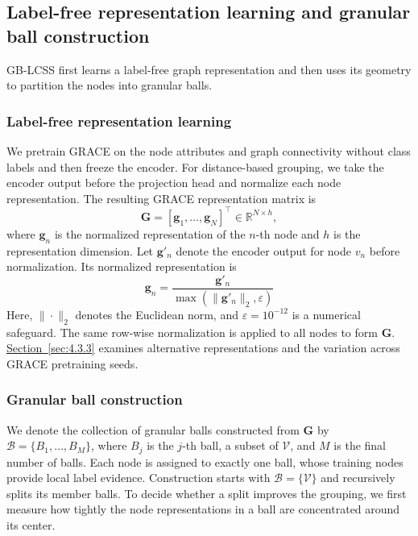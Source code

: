 \documentclass[10pt,letterpaper,nopreprintline]{elsarticle}
\theoremstyle{definition}
\theoremstyle{plain}
\begin{document}
\subsection{Label-free representation learning and granular ball construction}\label{sec:3.2}

GB-LCSS first learns a label-free graph representation and then uses its geometry to partition the nodes into granular balls.

\subsubsection{Label-free representation learning}\label{sec:3.2.1}

We pretrain GRACE \cite{ref12} on the node attributes and graph connectivity without class labels and then freeze the encoder. For distance-based grouping, we take the encoder output before the projection head and normalize each node representation. The resulting GRACE representation matrix is
\begin{equation}\label{eq:2}
\mathbf G=[\mathbf g_1,\ldots,\mathbf g_N]^\top\in\mathbb R^{N\times h},
\end{equation}
where \(\mathbf g_n\) is the normalized representation of the \(n\)-th node and \(h\) is the representation dimension. Let \(\mathbf g'_n\) denote the encoder output for node \(v_n\) before normalization. Its normalized representation is
\begin{equation}\label{eq:3}
\mathbf g_n=\frac{\mathbf g'_n}{\max(\|\mathbf g'_n\|_2,\varepsilon)}
\end{equation}
Here, \(\|\cdot\|_2\) denotes the Euclidean norm, and \(\varepsilon=10^{-12}\) is a numerical safeguard. The same row-wise normalization is applied to all nodes to form \(\mathbf G\). \hyperref[sec:4.3.3]{Section~\ref*{sec:4.3.3}} examines alternative representations and the variation across GRACE pretraining seeds.

\subsubsection{Granular ball construction}\label{sec:3.2.2}

We denote the collection of granular balls constructed from \(\mathbf G\) by \(\mathcal B=\{B_1,\ldots,B_M\}\), where \(B_j\) is the \(j\)-th ball, a subset of \(\mathcal V\), and \(M\) is the final number of balls. Each node is assigned to exactly one ball, whose training nodes provide local label evidence. Construction starts with \(\mathcal B=\{\mathcal V\}\) and recursively splits its member balls. To decide whether a split improves the grouping, we first measure how tightly the node representations in a ball are concentrated around its center.
\end{document}
